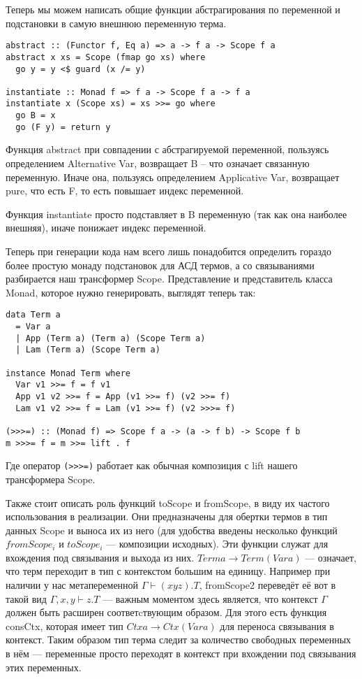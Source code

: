 Теперь мы можем написать общие функции абстрагирования по переменной и подстановки в самую внешнюю переменную терма.
\begin{lstlisting}[frame=single]
abstract :: (Functor f, Eq a) => a -> f a -> Scope f a
abstract x xs = Scope (fmap go xs) where
  go y = y <$ guard (x /= y)

instantiate :: Monad f => f a -> Scope f a -> f a
instantiate x (Scope xs) = xs >>= go where
  go B = x
  go (F y) = return y
\end{lstlisting}

Функция abstract при совпадении с абстрагируемой переменной, пользуясь определением Alternative Var, возвращает B -- что означает связанную переменную. Иначе она, пользуясь определением Applicative Var, возвращает pure, что есть F, то есть повышает индекс переменной.

Функция instantiate просто подставляет в B переменную (так как она наиболее внешняя), иначе понижает индекс переменной.

Теперь при генерации кода нам всего лишь понадобится определить гораздо более простую монаду подстановок для АСД термов, а со связываниями разбирается наш трансформер Scope. Представление и представитель класса Monad, которое нужно генерировать, выглядят теперь так:

\begin{lstlisting}[frame=single]
data Term a
  = Var a
  | App (Term a) (Term a) (Scope Term a)
  | Lam (Term a) (Scope Term a)

instance Monad Term where
  Var v1 >>= f = f v1
  App v1 v2 >>= f = App (v1 >>= f) (v2 >>= f)
  Lam v1 v2 >>= f = Lam (v1 >>= f) (v2 >>>= f)

(>>>=) :: (Monad f) => Scope f a -> (a -> f b) -> Scope f b
m >>>= f = m >>= lift . f
\end{lstlisting}

Где оператор \lstinline{(>>>=)} работает как обычная композиция с lift нашего трансформера Scope.

Также стоит описать роль функций toScope и fromScope, в виду их частого использования в реализации. Они предназначены для обертки термов в тип данных Scope и выноса их из него (для удобства введены несколько функций $fromScope_i$ и $toScope_i$ --- композиции исходных). Эти функции служат для вхождения под связывания и выхода из них. $Term a \rightarrow Term (Var a)$ --- означает, что терм переходит в тип с контекстом большим на единицу. Например при наличии у нас метапеременной $\Gamma \vdash (x y z).T$, fromScope2 переведёт её вот в такой вид $\Gamma, x, y \vdash z.T$ --- важным моментом здесь является, что контекст $\Gamma$ должен быть расширен соответcтвующим образом. Для этого есть функция consCtx, которая имеет тип $Ctx a \rightarrow Ctx (Var a)$ для переноса связывания в контекст. Таким образом тип терма следит за количество свободных переменных в нём --- переменные просто переходят в контекст при вхождении под связывания этих переменных.

